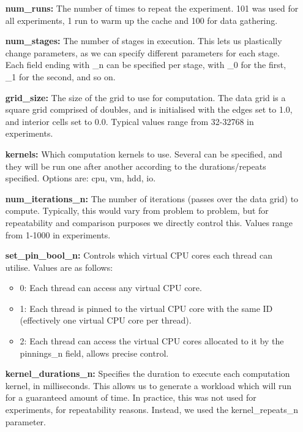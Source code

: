 \begin{itemize}
    \item[\textbf{num\_runs:}]            The number of times to repeat the experiment. 101 was used for all experiments, 1 run to warm up the cache and 100 for data gathering.
    
    \item[\textbf{num\_stages:}]          The number of stages in execution. This lets us plastically change parameters, as we can specify different parameters for each stage. Each field ending with \_n can be specified per stage, with \_0 for the first, \_1 for the second, and so on.
    
    \item[\textbf{grid\_size:}]           The size of the grid to use for computation. The data grid is a square grid comprised of doubles, and is initialised with the edges set to 1.0, and interior cells set to 0.0. Typical values range from 32-32768 in experiments.
    
    \item[\textbf{kernels:}]              Which computation kernels to use. Several can be specified, and they will be run one after another according to the durations/repeats specified. Options are: cpu, vm, hdd, io.
    
    \item[\textbf{num\_iterations\_n:}]   The number of iterations (passes over the data grid) to compute. Typically, this would vary from problem to problem, but for repeatability and comparison purposes we directly control this. Values range from 1-1000 in experiments.
    
    \item[\textbf{set\_pin\_bool\_n:}]    Controls which virtual CPU cores each thread can utilise. Values are as follows:
        \begin{itemize}
            \item 0: Each thread can access any virtual CPU core.
            \item 1: Each thread is pinned to the virtual CPU core with the same ID (effectively one virtual CPU core per thread).
            \item 2: Each thread can access the virtual CPU cores allocated to it by the pinnings\_n field, allows precise control.
        \end{itemize}
    
    \item[\textbf{kernel\_durations\_n:}] Specifies the duration to execute each computation kernel, in milliseconds. This allows us to generate a workload which will run for a guaranteed amount of time. In practice, this was not used for experiments, for repeatability reasons. Instead, we used the kernel\_repeats\_n parameter.
    

\end{itemize}
